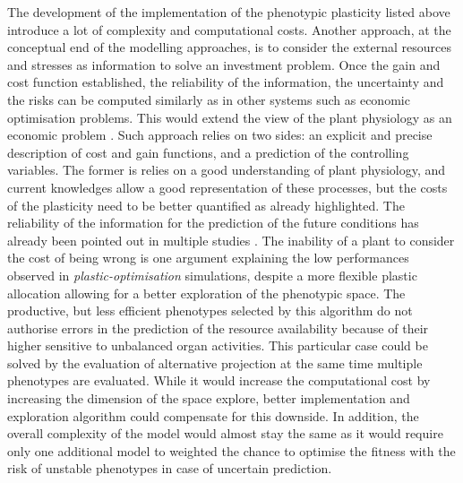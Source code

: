 The development of the implementation of the phenotypic plasticity listed above introduce a lot of complexity and computational costs. Another approach, at the conceptual end of the modelling approaches, is to consider the external resources and stresses as information to solve an investment problem. Once the gain and cost function established, the reliability of the information, the uncertainty and the risks can be computed similarly as in other systems such as economic optimisation problems. This would extend the view of the plant physiology as an economic problem \parencite{westoby_time_2000, wright_worldwide_2004, mcmurtrie_leaf-trait_2011}. Such approach relies on two sides: an explicit and precise description of cost and gain functions, and a prediction of the controlling variables. The former is relies on a good understanding of plant physiology, and current knowledges allow a good representation of these processes, but the costs of the plasticity need to be better quantified as already highlighted. The reliability of the information for the prediction of the future conditions has already been pointed out in multiple studies \parencite{ dewitt_costs_1998, auld_re-evaluating_2009, richter_phenotypic_2012}. The inability of a plant to consider the cost of being wrong is one argument explaining the low performances observed in \textit{plastic-optimisation} simulations, despite a more flexible plastic allocation allowing for a better exploration of the phenotypic space. The productive, but less efficient phenotypes selected by this algorithm do not authorise errors in the prediction of the resource availability because of their higher sensitive to unbalanced organ activities. This particular case could be solved by the evaluation of alternative projection at the same time multiple phenotypes are evaluated. While it would increase the computational cost by increasing the dimension of the space explore, better implementation and exploration algorithm could compensate for this downside. In addition, the overall complexity of the model would almost stay the same as it would require only one additional model to weighted the chance to optimise the fitness with the risk of unstable phenotypes in case of uncertain prediction.

